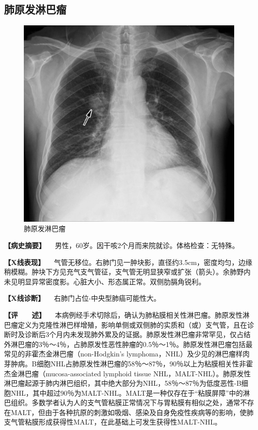 \subsection{肺原发淋巴瘤}

\begin{figure}[!htbp]
 \centering
 \includegraphics{./images/Image00172.jpg}
 \captionsetup{justification=centering}
 \caption{肺原发淋巴瘤}
 \label{fig3-8-10}
  \end{figure} 

\textbf{【病史摘要】}
　男性，60岁。因干咳2个月而来院就诊。体格检查：无特殊。

\textbf{【X线表现】}
　气管无移位。右肺门见一肿块影，直径约3.5cm，密度均匀，边缘稍模糊。肿块下方见充气支气管征，支气管无明显狭窄或扩张（箭头）。余肺野内未见明显异常密度影。心脏大小、形态属正常。双侧肋膈角锐利。

\textbf{【X线诊断】} 　右肺门占位-中央型肺癌可能性大。

\textbf{【评　　述】}
　本病例经手术切除后，确认为肺粘膜相关性淋巴瘤。肺原发性淋巴瘤定义为克隆性淋巴样增殖，影响单侧或双侧肺的实质和（或）支气管，且在诊断时及诊断后3个月内未发现肺外累及的证据。肺原发性淋巴瘤非常罕见，仅占结外淋巴瘤的3％～4％，占肺原发性恶性肿瘤的0.5％～1％。肺原发性淋巴瘤包括最常见的非霍杰金淋巴瘤（non-Hodgkin's
lymphoma，NHL）及少见的淋巴瘤样肉芽肿病。B细胞NHL占肺原发性淋巴瘤的58％～87％，90％以上为粘膜相关性非霍杰金淋巴瘤（mucosa-associated
lymphoid tissue
NHL，MALT-NHL）。肺原发性淋巴瘤起源于肺内淋巴组织，其中绝大部分为NHL，58％～87％为低度恶性-B细胞NHL，其中超过90％为MALT-NHL。MALT是一种仅存在于“粘膜屏障”中的淋巴组织。多数学者认为人的支气管粘膜正常情况下与胃粘膜有相似之处，通常不存在MALT，但由于各种抗原的刺激如吸烟、感染及自身免疫性疾病等的影响，使肺支气管粘膜形成获得性MALT，在此基础上可发生获得性MALT-NHL。

